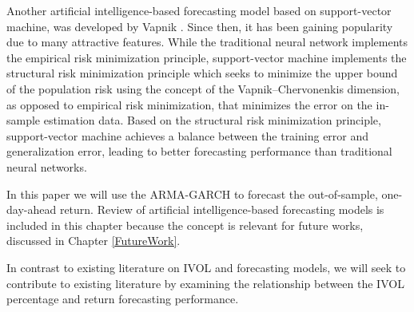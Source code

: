 Another artificial intelligence-based forecasting model based on support-vector machine, was developed by Vapnik \cite{Vapnik1}\cite{Vapnik2}. Since then, it has been gaining popularity due to many attractive features. While the traditional neural network implements the empirical risk minimization principle, support-vector machine implements the structural risk minimization principle which seeks to minimize the upper bound of the population risk using the concept of the Vapnik–Chervonenkis dimension, as opposed to empirical risk minimization, that minimizes the error on the in-sample estimation data. Based on the structural risk minimization principle, support-vector machine achieves a balance between the training error and generalization error, leading to better forecasting performance than traditional neural networks. 

In this paper we will use the ARMA-GARCH to forecast the out-of-sample, one-day-ahead return. Review of artificial intelligence-based forecasting models is included in this chapter because the concept is relevant for future works, discussed in Chapter \ref{FutureWork}.

In contrast to existing literature on IVOL and forecasting models, we will seek to contribute to existing literature by examining the relationship between the IVOL percentage and return forecasting performance. 
